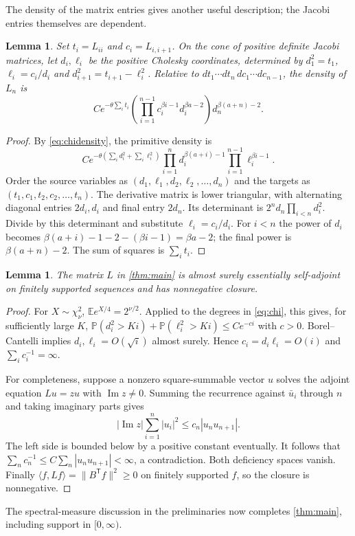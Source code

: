 \documentclass[10pt]{amsart}
\newtheorem{lemma}[theorem]{Lemma}
\newcommand{\E}{\mathbb E}
\newcommand{\T}{\mathsf T}
\begin{document}
The density of the matrix entries gives another useful description;
the Jacobi entries themselves are dependent.
\begin{lemma}\label{lem:entrydensity}
Set $t_i=L_{ii}$ and $c_i=L_{i,i+1}$. On the cone of positive definite
Jacobi matrices, let $d_i,\ell_i$ be the positive Cholesky coordinates,
determined by $d_1^2=t_1$, $\ell_i=c_i/d_i$ and
$d_{i+1}^2=t_{i+1}-\ell_i^2$. Relative to
$dt_1\cdots dt_n\,dc_1\cdots dc_{n-1}$, the density of $L_n$ is
\begin{equation}\label{eq:entrydensity}
 C e^{-\theta\sum_i t_i}
 \left(\prod_{i=1}^{n-1}c_i^{\beta i-1}d_i^{\beta a-2}\right)
 d_n^{\beta(a+n)-2}.
\end{equation}
\end{lemma}
\begin{proof}
By \eqref{eq:chidensity}, the primitive density is
\[
 C e^{-\theta(\sum_i d_i^2+\sum_i\ell_i^2)}
 \prod_{i=1}^n d_i^{\beta(a+i)-1}
 \prod_{i=1}^{n-1}\ell_i^{\beta i-1}.
\]
Order the source variables as $(d_1,\ell_1,d_2,\ell_2,\ldots,d_n)$
and the targets as $(t_1,c_1,t_2,c_2,\ldots,t_n)$.
The derivative matrix is lower triangular, with alternating diagonal
entries $2d_i,d_i$ and final entry $2d_n$. Its determinant is
$2^n d_n\prod_{i<n}d_i^2$. Divide by this determinant and substitute
$\ell_i=c_i/d_i$. For $i<n$ the power of $d_i$ becomes
$\beta(a+i)-1-2-(\beta i-1)=\beta a-2$; the final power is
$\beta(a+n)-2$. The sum of squares is $\sum_i t_i$.
\end{proof}

\begin{lemma}\label{lem:operator}
The matrix $L$ in \cref{thm:main} is almost surely essentially
self-adjoint on finitely supported sequences and has nonnegative closure.
\end{lemma}
\begin{proof}
For $X\sim\chi_\nu^2$, $\E e^{X/4}=2^{\nu/2}$. Applied to the
degrees in \eqref{eq:chi}, this gives, for sufficiently large $K$,
$\mathbb P(d_i^2>Ki)+\mathbb P(\ell_i^2>Ki)\leq C e^{-ci}$
with $c>0$. Borel--Cantelli implies $d_i,\ell_i=O(\sqrt i)$ almost
surely. Hence $c_i=d_i\ell_i=O(i)$ and $\sum_i c_i^{-1}=\infty$.

For completeness, suppose a nonzero square-summable vector $u$
solves the adjoint equation $Lu=zu$ with $\operatorname{Im}z\ne0$.
Summing the recurrence against $\bar u_i$ through $n$ and taking
imaginary parts gives
\[
 |\operatorname{Im}z|\sum_{i=1}^n|u_i|^2
 \leq c_n|u_nu_{n+1}|.
\]
The left side is bounded below by a positive constant eventually.
It follows that $\sum_n c_n^{-1}\leq C\sum_n|u_nu_{n+1}|<\infty$,
a contradiction. Both deficiency spaces vanish. Finally
$\langle f,Lf\rangle=\|B^\T f\|^2\geq0$ on finitely supported $f$,
so the closure is nonnegative.
\end{proof}
The spectral-measure discussion in the preliminaries now completes
\cref{thm:main}, including support in $[0,\infty)$.
\end{document}
